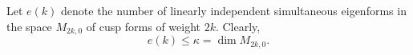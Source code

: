Let $e(k)$ denote the number of linearly independent simultaneous eigenforms in the space $M_{2k,0}$ of cusp forms of weight $2k$. Clearly,
$$
e(k) \leq \kappa = \dim M_{2k,0}.
$$
